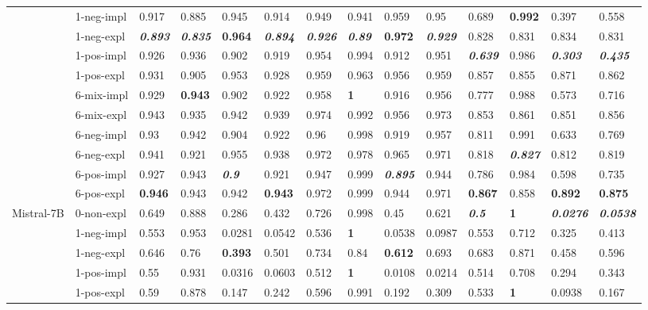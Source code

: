 \begin{tabular}{ll|llll|llll|llll}
 & 1-neg-impl & 0.917 & 0.885 & 0.945 & 0.914 & 0.949 & 0.941 & 0.959 & 0.95 & 0.689 & \bfseries 0.992 & 0.397 & 0.558 \\
 & 1-neg-expl & \bfseries \itshape 0.893 & \bfseries \itshape 0.835 & \bfseries 0.964 & \bfseries \itshape 0.894 & \bfseries \itshape 0.926 & \bfseries \itshape 0.89 & \bfseries 0.972 & \bfseries \itshape 0.929 & 0.828 & 0.831 & 0.834 & 0.831 \\
 & 1-pos-impl & 0.926 & 0.936 & 0.902 & 0.919 & 0.954 & 0.994 & 0.912 & 0.951 & \bfseries \itshape 0.639 & 0.986 & \bfseries \itshape 0.303 & \bfseries \itshape 0.435 \\
 & 1-pos-expl & 0.931 & 0.905 & 0.953 & 0.928 & 0.959 & 0.963 & 0.956 & 0.959 & 0.857 & 0.855 & 0.871 & 0.862 \\
 & 6-mix-impl & 0.929 & \bfseries 0.943 & 0.902 & 0.922 & 0.958 & \bfseries 1 & 0.916 & 0.956 & 0.777 & 0.988 & 0.573 & 0.716 \\
 & 6-mix-expl & 0.943 & 0.935 & 0.942 & 0.939 & 0.974 & 0.992 & 0.956 & 0.973 & 0.853 & 0.861 & 0.851 & 0.856 \\
 & 6-neg-impl & 0.93 & 0.942 & 0.904 & 0.922 & 0.96 & 0.998 & 0.919 & 0.957 & 0.811 & 0.991 & 0.633 & 0.769 \\
 & 6-neg-expl & 0.941 & 0.921 & 0.955 & 0.938 & 0.972 & 0.978 & 0.965 & 0.971 & 0.818 & \bfseries \itshape 0.827 & 0.812 & 0.819 \\
 & 6-pos-impl & 0.927 & 0.943 & \bfseries \itshape 0.9 & 0.921 & 0.947 & 0.999 & \bfseries \itshape 0.895 & 0.944 & 0.786 & 0.984 & 0.598 & 0.735 \\
 & 6-pos-expl & \bfseries 0.946 & 0.943 & 0.942 & \bfseries 0.943 & 0.972 & 0.999 & 0.944 & 0.971 & \bfseries 0.867 & 0.858 & \bfseries 0.892 & \bfseries 0.875 \\
\midrule
\multirow[t]{11}{*}{Mistral-7B} & 0-non-expl & 0.649 & 0.888 & 0.286 & 0.432 & 0.726 & 0.998 & 0.45 & 0.621 & \bfseries \itshape 0.5 & \bfseries 1 & \bfseries \itshape 0.0276 & \bfseries \itshape 0.0538 \\
 & 1-neg-impl & 0.553 & 0.953 & 0.0281 & 0.0542 & 0.536 & \bfseries 1 & 0.0538 & 0.0987 & 0.553 & 0.712 & 0.325 & 0.413 \\
 & 1-neg-expl & 0.646 & 0.76 & \bfseries 0.393 & 0.501 & 0.734 & 0.84 & \bfseries 0.612 & 0.693 & 0.683 & 0.871 & 0.458 & 0.596 \\
 & 1-pos-impl & 0.55 & 0.931 & 0.0316 & 0.0603 & 0.512 & \bfseries 1 & 0.0108 & 0.0214 & 0.514 & 0.708 & 0.294 & 0.343 \\
 & 1-pos-expl & 0.59 & 0.878 & 0.147 & 0.242 & 0.596 & 0.991 & 0.192 & 0.309 & 0.533 & \bfseries 1 & 0.0938 & 0.167 \\

\end{tabular}
